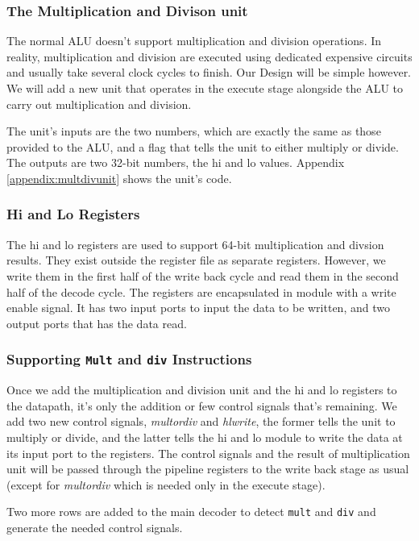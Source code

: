 \documentclass[titlepage,12pt,oneside,a4paper]{article}
\newcommand{\code}[1]{{\texttt{#1}}}
\begin{document}
\subsubsection{The Multiplication and Divison unit}
The normal ALU doesn't support multiplication and division operations. In reality, multiplication and division are executed using dedicated expensive circuits and usually take several clock cycles to finish. Our Design will be simple however. We will add a new unit that operates in the execute stage alongside the ALU to carry out multiplication and division.

The unit's inputs are the two numbers, which are exactly the same as those provided to the ALU, and a flag that tells the unit to either multiply or divide. The outputs are two 32-bit numbers, the hi and lo values. Appendix \ref{appendix:multdivunit} shows the unit's code.

\subsubsection{Hi and Lo Registers}
The hi and lo registers are used to support 64-bit multiplication and divsion results. They exist outside the register file as separate registers. However, we write them in the first half of the write back cycle and read them in the second half of the decode cycle. The registers are encapsulated in module with a write enable signal. It has two input ports to input the data to be written, and two output ports that has the data read.

\subsubsection{Supporting \code{Mult} and \code{div} Instructions}
Once we add the multiplication and division unit and the hi and lo registers to the datapath, it's only the addition or few control signals that's remaining. We add two new control signals, \textit{multordiv} and \textit{hlwrite}, the former tells the unit to multiply or divide, and the latter tells the hi and lo module to write the data at its input port to the registers. The control signals and the result of multiplication unit will be passed through the pipeline registers to the write back stage as usual (except for \textit{multordiv} which is needed only in the execute stage).

Two more rows are added to the main decoder to detect \code{mult} and \code{div} and generate the needed control signals.
\end{document}
